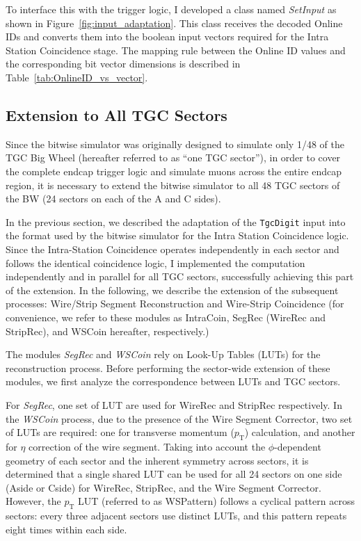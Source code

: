 To interface this with the trigger logic, I developed a class named \textit{SetInput} as shown in Figure~\ref{fig:input_adaptation}. This class receives the decoded Online IDs and converts them into the boolean input vectors required for the Intra Station Coincidence stage. The mapping rule between the Online ID values and the corresponding bit vector dimensions is described in Table~\ref{tab:OnlineID_vs_vector}.


\subsection{Extension to All TGC Sectors} \label{subsec:Extension}
Since the bitwise simulator was originally designed to simulate only 1/48 of the TGC Big Wheel (hereafter referred to as “one TGC sector”), in order to cover the complete endcap trigger logic and simulate muons across the entire endcap region, it is necessary to extend the bitwise simulator to all 48 TGC sectors of the BW (24 sectors on each of the A and C sides).

In the previous section, we described the adaptation of the \texttt{TgcDigit} input into the format used by the bitwise simulator for the Intra Station Coincidence logic. Since the Intra-Station Coincidence operates independently in each sector and follows the identical coincidence logic, I implemented the computation independently and in parallel for all TGC sectors, successfully achieving this part of the extension. In the following, we describe the extension of the subsequent processes: Wire/Strip Segment Reconstruction and Wire-Strip Coincidence (for convenience, we refer to these modules as IntraCoin, SegRec (WireRec and StripRec), and WSCoin hereafter, respectively.)

The modules \textit{SegRec} and \textit{WSCoin} rely on Look-Up Tables (LUTs) for the reconstruction process. Before performing the sector-wide extension of these modules, we first analyze the correspondence between LUTs and TGC sectors.

For \textit{SegRec}, one set of LUT are used for WireRec and StripRec respectively. In the \textit{WSCoin} process, due to the presence of the Wire Segment Corrector, two set of LUTs are required: one for transverse momentum ($p_\mathrm{T}$) calculation, and another for $\eta$ correction of the wire segment. Taking into account the $\phi$-dependent geometry of each sector and the inherent symmetry across sectors, it is determined that a single shared LUT can be used for all 24 sectors on one side (Aside or Cside) for WireRec, StripRec, and the Wire Segment Corrector. However, the $p_\mathrm{T}$ LUT (referred to as WSPattern) follows a cyclical pattern across sectors: every three adjacent sectors use distinct LUTs, and this pattern repeats eight times within each side.

